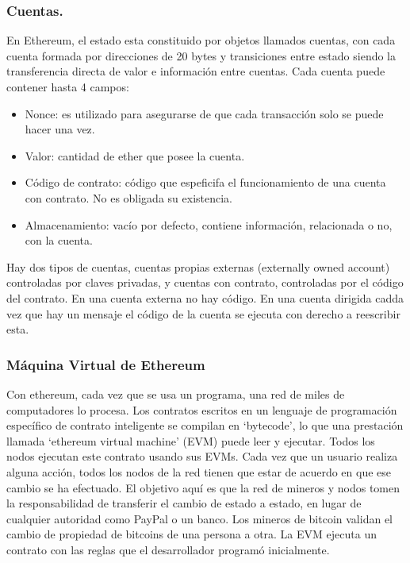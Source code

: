 \documentclass[11pt,a4paper]{article}
\begin{document}
\subsubsection{Cuentas.}
En Ethereum, el estado esta constituido por objetos llamados cuentas, con cada cuenta formada por direcciones de 20 bytes y transiciones entre estado siendo la transferencia directa de valor e información entre cuentas. Cada cuenta puede contener hasta 4 campos:
\begin{itemize}
	\item Nonce: es utilizado para asegurarse de que cada transacción solo se puede hacer una vez.
	\item Valor: cantidad de ether que posee la cuenta.
	\item Código de contrato: código que espeficifa el funcionamiento de una cuenta con contrato. No es obligada su existencia.
	\item Almacenamiento: vacío por defecto, contiene información, relacionada o no, con la cuenta.
\end{itemize}
Hay dos tipos de cuentas, cuentas propias externas (externally owned account) controladas por claves privadas, y cuentas con contrato, controladas por el código del contrato. En una cuenta externa no hay código. En una cuenta dirigida cadda vez que hay un mensaje el código de la cuenta se ejecuta con derecho a reescribir esta.

\subsubsection{Máquina Virtual de Ethereum}
Con ethereum, cada vez que se usa un programa, una red de miles de computadores lo procesa. Los contratos escritos en un lenguaje de programación específico de contrato inteligente se compilan en ‘bytecode’, lo que una prestación llamada ‘ethereum virtual machine’ (EVM) puede leer y ejecutar. Todos los nodos ejecutan este contrato usando sus EVMs.  Cada vez que un usuario realiza alguna acción, todos los nodos de la red tienen que estar de acuerdo en que ese cambio se ha efectuado.
El objetivo aquí es que la red de mineros y nodos tomen la responsabilidad de transferir el cambio de estado a estado, en lugar de cualquier autoridad como PayPal o un banco. Los mineros de bitcoin validan el cambio de propiedad de bitcoins de una persona a otra. La EVM ejecuta un  contrato con las reglas que el desarrollador programó inicialmente. \\
\end{document}
